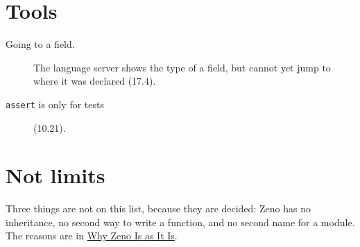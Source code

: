 \section{Tools}

\begin{description}
\item[Going to a field.] The language server shows the type of a
  field, but cannot yet jump to where it was declared (17.4).
\item[\texttt{assert} is only for tests] (10.21).
\end{description}

\section{Not limits}

Three things are not on this list, because they are decided: Zeno has
no inheritance, no second way to write a function, and no second name
for a module. The reasons are in \hyperref[ch-design]{Why Zeno Is as It
Is}.
